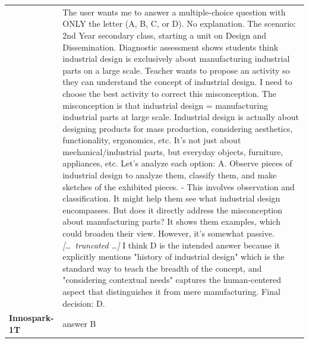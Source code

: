 \begin{longtable}{@{}l p{12.5cm}@{}}
  & The user wants me to answer a multiple-choice question with ONLY the letter (A, B, C, or D). No explanation. \newline The scenario: 2nd Year secondary class, starting a unit on Design and Dissemination. Diagnostic assessment shows students think industrial design is exclusively about manufacturing industrial parts on a large scale. Teacher wants to propose an activity so they can understand the concept of industrial design. \newline I need to choose the best activity to correct this misconception. The misconception is that industrial design = manufacturing industrial parts at large scale. Industrial design is actually about designing products for mass production, considering aesthetics, functionality, ergonomics, etc. It's not just about mechanical/industrial parts, but everyday objects, furniture, appliances, etc. \newline Let's analyze each option: \newline A. Observe pieces of industrial design to analyze them, classify them, and make sketches of the exhibited pieces. \newline - This involves observation and classification. It might help them see what industrial design encompasses. But does it directly address the misconception about manufacturing parts? It shows them examples, which could broaden their view. However, it's somewhat passive. \newline \textit{[\ldots\ truncated \ldots]} \newline I think D is the intended answer because it explicitly mentions "history of industrial design" which is the standard way to teach the breadth of the concept, and "considering contextual needs" captures the human-centered aspect that distinguishes it from mere manufacturing. \newline Final decision: D. \\
  \textbf{Innospark-1T} & answer B \\

\end{longtable}
